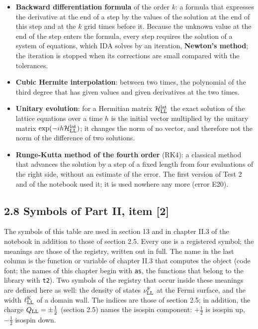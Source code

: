 \documentclass[
  10pt,
]{article}
\begin{document}
\begin{itemize}
  the original programs use it with the \textbf{Adams-Moulton formulas}
  of the orders 1 to 12 (formulas that express the value at the end of a
  step by the derivatives at the end of this step and of the steps
  before it). \textbf{IDA} is its integrator of differential-algebraic
  equations; the Wolfram Language contains it, and the notebook uses it.
\item
  \textbf{Backward differentiation formula} of the order \(k\): a
  formula that expresses the derivative at the end of a step by the
  values of the solution at the end of this step and at the \(k\) grid
  times before it. Because the unknown value at the end of the step
  enters the formula, every step requires the solution of a system of
  equations, which IDA solves by an iteration, \textbf{Newton's method};
  the iteration is stopped when its corrections are small compared with
  the tolerances.
\item
  \textbf{Cubic Hermite interpolation}: between two times, the
  polynomial of the third degree that has given values and given
  derivatives at the two times.
\item
  \textbf{Unitary evolution}: for a Hermitian matrix
  \(\mathcal H^{\rm lat}_{\rm LL}\) the exact solution of the lattice
  equations over a time \(h\) is the initial vector multiplied by the
  unitary matrix \(\exp(-ih\mathcal H^{\rm lat}_{\rm LL})\); it changes
  the norm of no vector, and therefore not the norm of the difference of
  two solutions.
\item
  \textbf{Runge-Kutta method of the fourth order} (RK4): a classical
  method that advances the solution by a step of a fixed length from
  four evaluations of the right side, without an estimate of the error.
  The first version of Test 2 and of the notebook used it; it is used
  nowhere any more (error E20).
\end{itemize}

\hypertarget{symbols-of-part-ii-item-2}{%
\subsection{2.8 Symbols of Part II, item
{[}2{]}}\label{symbols-of-part-ii-item-2}}

The symbols of this table are used in section 13 and in chapter II.3 of
the notebook in addition to those of section 2.5. Every one is a
registered symbol; the meanings are those of the registry, written out
in full. The name in the last column is the function or variable of
chapter II.3 that computes the object (code font; the names of this
chapter begin with \texttt{as}, the functions that belong to the library
with \texttt{t2}). Two symbols of the registry that occur inside these
meanings are defined here as well: the density of states
\(\nu^{\rm F}_{\rm LL}\) at the Fermi surface, and the width
\(\ell^{\rm K}_{\rm LL}\) of a domain wall. The indices are those of
section 2.5; in addition, the charge \(Q_{\rm LL}=\pm\tfrac12\) (section
2.5) names the isospin component: \(+\tfrac12\) is isospin up,
\(-\tfrac12\) isospin down.
\end{document}
